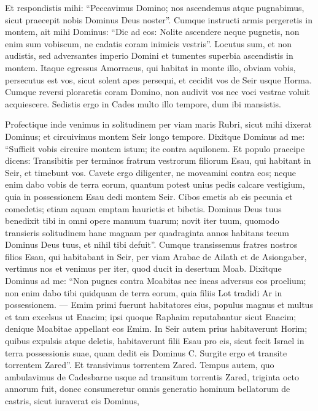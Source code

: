 \begin{biblechapter}
\verse Et respondistis mihi: “Peccavimus Domino; nos ascendemus atque pugnabimus, sicut praecepit nobis Dominus Deus noster”. Cumque instructi armis pergeretis in montem, 
\verse ait mihi Dominus: “Dic ad eos: Nolite ascendere neque pugnetis, non enim sum vobiscum, ne cadatis coram inimicis vestris”. 
\verse Locutus sum, et non audistis, sed adversantes imperio Domini et tumentes superbia ascendistis in montem. 
\verse Itaque egressus Amorraeus, qui habitat in monte illo, obviam vobis, persecutus est vos, sicut solent apes persequi, et cecidit vos de Seir usque Horma. 
\verse Cumque reversi ploraretis coram Domino, non audivit vos nec voci vestrae voluit acquiescere. 
\verse Sedistis ergo in Cades multo illo tempore, dum ibi mansistis. 
\end{biblechapter}

\begin{biblechapter} 
\verse Profectique inde venimus in solitudinem per viam maris Rubri, sicut mihi dixerat Dominus; et circuivimus montem Seir longo tempore. 
\verse Dixitque Dominus ad me: 
\verse “Sufficit vobis circuire montem istum; ite contra aquilonem. 
\verse Et populo praecipe dicens: Transibitis per terminos fratrum vestrorum filiorum Esau, qui habitant in Seir, et timebunt vos. 
\verse Cavete ergo diligenter, ne moveamini contra eos; neque enim dabo vobis de terra eorum, quantum potest unius pedis calcare vestigium, quia in possessionem Esau dedi montem Seir. 
\verse Cibos emetis ab eis pecunia et comedetis; etiam aquam emptam haurietis et bibetis.  
\verse Dominus Deus tuus benedixit tibi in omni opere manuum tuarum; novit iter tuum, quomodo transieris solitudinem hanc magnam per quadraginta annos habitans tecum Dominus Deus tuus, et nihil tibi defuit”. 
\verse Cumque transissemus fratres nostros filios Esau, qui habitabant in Seir, per viam Arabae de Ailath et de Asiongaber, vertimus nos et venimus per iter, quod ducit in desertum Moab. 
\verse Dixitque Dominus ad me: “Non pugnes contra Moabitas nec ineas adversus eos proelium; non enim dabo tibi quidquam de terra eorum, quia filiis Lot tradidi Ar in possessionem. 
\verse — Emim primi fuerunt habitatores eius, populus magnus et multus et tam excelsus ut Enacim; 
\verse ipsi quoque Raphaim reputabantur sicut Enacim; denique Moabitae appellant eos Emim. 
\verse In Seir autem prius habitaverunt Horim; quibus expulsis atque deletis, habitaverunt filii Esau pro eis, sicut fecit Israel in terra possessionis suae, quam dedit eis Dominus C. 
\verse Surgite ergo et transite torrentem Zared”. Et transivimus torrentem Zared. 
\verse Tempus autem, quo ambulavimus de Cadesbarne usque ad transitum torrentis Zared, triginta octo annorum fuit, donec consumeretur omnis generatio hominum bellatorum de castris, sicut iuraverat eis Dominus, 

\end{biblechapter}
